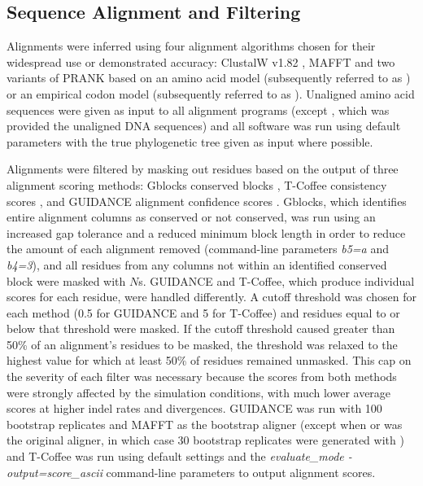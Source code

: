 \documentclass{mbe}
\begin{document}
\subsection*{Sequence Alignment and Filtering}

Alignments were inferred using four alignment algorithms chosen for
their widespread use or demonstrated accuracy: ClustalW v1.82
\citep{Thompson1994ClustalW}, MAFFT \citep{Katoh2005MAFFT} and two
variants of PRANK \citep{Loytynoja2005From} based on an amino acid
model (subsequently referred to as \pranka{}) or an empirical codon
model (subsequently referred to as \prankc{}). Unaligned amino acid
sequences were given as input to all alignment programs (except
\prankc{}, which was provided the unaligned DNA sequences) and all
software was run using default parameters with the true phylogenetic
tree given as input where possible.

Alignments were filtered by masking out residues based on the output
of three alignment scoring methods: Gblocks conserved blocks
\citep{Castresana2000Selection}, T-Coffee consistency scores
\citep{Notredame2000TCoffee,Notredame2003Using}, and GUIDANCE
alignment confidence scores \citep{Penn2010Alignment}. Gblocks, which
identifies entire alignment columns as conserved or not conserved, was
run using an increased gap tolerance and a reduced minimum block
length in order to reduce the amount of each alignment removed
(command-line parameters {\em b5=a} and {\em b4=3}), and all residues
from any columns not within an identified conserved block were masked
with $N$s. GUIDANCE and T-Coffee, which produce individual scores for
each residue, were handled differently. A cutoff threshold was chosen
for each method (0.5 for GUIDANCE and 5 for T-Coffee) and residues
equal to or below that threshold were masked. If the cutoff threshold
caused greater than 50\% of an alignment's residues to be masked, the
threshold was relaxed to the highest value for which at least 50\% of
residues remained unmasked. This cap on the severity of each filter
was necessary because the scores from both methods were strongly
affected by the simulation conditions, with much lower average scores
at higher indel rates and divergences. GUIDANCE was run with 100
bootstrap replicates and MAFFT as the bootstrap aligner (except when
\pranka{} or \prankc{} was the original aligner, in which case 30
bootstrap replicates were generated with \pranka{}) and T-Coffee was
run using default settings and the {\em evaluate\_mode
  -output=score\_ascii} command-line parameters to output alignment
scores.
\end{document}

